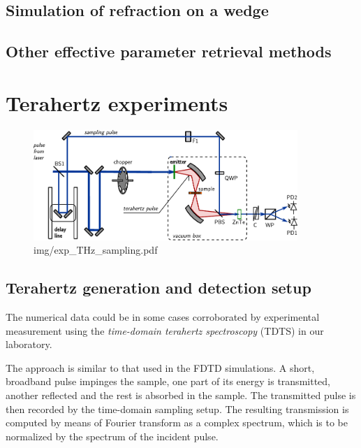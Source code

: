 \subsection{Simulation of refraction on a wedge} %
\subsection{Other effective parameter retrieval methods} %


\section{Terahertz experiments} %
\begin{figure} \caption{img/exp\_THz\_sampling.pdf}  \centering \includegraphics[width=10cm]{img/exp_THz_sampling.pdf} \end{figure} \clearpage
\subsection{Terahertz generation and detection setup}%
The numerical data could be in some cases corroborated by experimental measurement using the \textit{time-domain terahertz spectroscopy} (TDTS) in our laboratory. 

The approach is similar to that used in the FDTD simulations. A short, broadband pulse impinges the sample, one part of its energy is transmitted, another reflected and the rest is absorbed in the sample. The transmitted pulse is then recorded by the time-domain sampling setup. The resulting transmission is computed by means of Fourier transform as a complex spectrum, which is to be normalized by the spectrum of the incident pulse.


